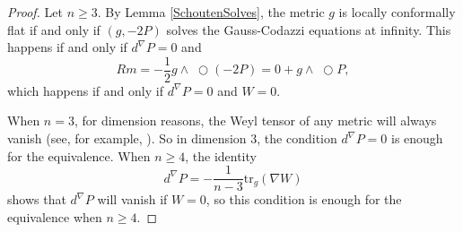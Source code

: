 \documentclass{amsart}
\newcommand{\tr}{\mathrm{tr}}
\newcommand{\wtimes}{\wedge \!\!\!\!\!\!\!\!\;\bigcirc}
\begin{document}
\begin{proof}
Let $n \geq 3$. 
By Lemma \ref{SchoutenSolves}, the metric $g$ is locally conformally flat if and only if $(g,-2P)$ solves the Gauss-Codazzi equations at infinity.
This happens if and only if $d^{\nabla}P = 0$ and 
\[
Rm = -\frac{1}{2}g\wtimes (-2P) = 0 + g \wtimes P,
\]
which happens if and only if $d^\nabla P = 0$ and $W = 0$.

When $n = 3$, for dimension reasons, the Weyl tensor of any metric will always vanish (see, for example, \cite{Lee2018}).
So in dimension 3, the condition $d^\nabla P = 0$ is enough for the equivalence.
When $n \geq 4$, the identity
\[
d^\nabla P = -\frac{1}{n-3}\tr_g(\nabla W)
\]
shows that $d^\nabla P$ will vanish if $W=0$, so this condition is enough for the equivalence when $n\geq4$.
\end{proof}






 
\end{document}
